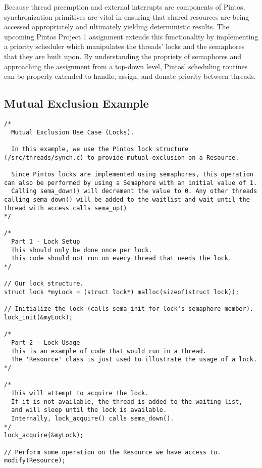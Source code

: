 \documentclass[11pt, letterpaper]{article}
\begin{document}
Because thread preemption and external interrupts are components of Pintos, synchronization primitives are vital in ensuring that shared resources are being accessed appropriately and ultimately yielding deterministic results. The upcoming Pintos Project 1 assignment extends this functionality by implementing a priority scheduler which manipulates the threads’ locks and the semaphores that they are built upon. By understanding the propriety of semaphores and approaching the assignment from a top-down level, Pintos’ scheduling routines can be properly extended to handle, assign, and donate priority between threads.

\pagebreak
\begin{appendices}

\section{Mutual Exclusion Example}
\begin{lstlisting}[frame=single,basicstyle=\footnotesize]
/*
  Mutual Exclusion Use Case (Locks).

  In this example, we use the Pintos lock structure (/src/threads/synch.c) to provide mutual exclusion on a Resource.

  Since Pintos locks are implemented using semaphores, this operation can also be performed by using a Semaphore with an initial value of 1. 
  Calling sema_down() will decrement the value to 0. Any other threads calling sema_down() will be added to the waitlist and wait until the thread with access calls sema_up()
*/

/*
  Part 1 - Lock Setup
  This should only be done once per lock. 
  This code should not run on every thread that needs the lock.
*/

// Our lock structure.
struct lock *myLock = (struct lock*) malloc(sizeof(struct lock));

// Initialize the lock (calls sema_init for lock's semaphore member).
lock_init(&myLock);

/*
  Part 2 - Lock Usage
  This is an example of code that would run in a thread. 
  The 'Resource' class is just used to illustrate the usage of a lock.
*/

/*
  This will attempt to acquire the lock. 
  If it is not available, the thread is added to the waiting list, 
  and will sleep until the lock is available.
  Internally, lock_acquire() calls sema_down(). 
*/    
lock_acquire(&myLock);

// Perform some operation on the Resource we have access to.
modify(Resource);


\end{lstlisting}
\end{appendices}
\end{document}
